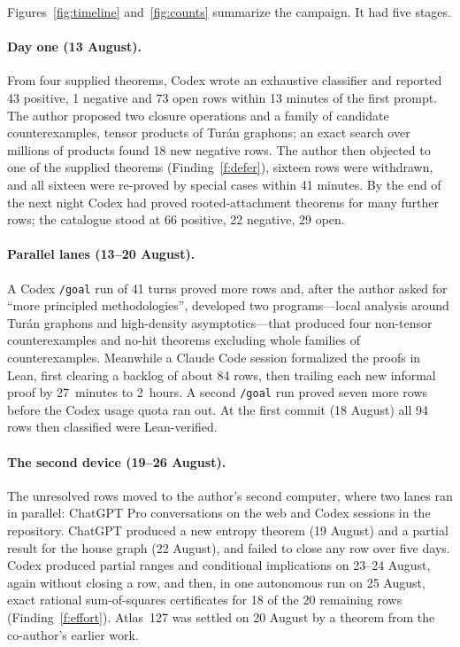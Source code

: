 \documentclass[11pt,a4paper]{article}
\newcommand{\ttt}[1]{\texttt{#1}}
\begin{document}
Figures~\ref{fig:timeline} and~\ref{fig:counts} summarize the campaign. It had five stages.

\paragraph{Day one (13 August).} From four supplied theorems, Codex wrote an exhaustive classifier and reported
43 positive, 1 negative and 73 open rows within 13 minutes of the first prompt. The author proposed two closure
operations and a family of candidate counterexamples, tensor products of Tur\'an graphons; an exact search
over millions of products found 18 new negative rows. The author then objected to one of the supplied theorems
(Finding~\ref{f:defer}), sixteen rows were withdrawn, and all sixteen were re-proved by special cases within 41
minutes. By the end of the next night Codex had proved rooted-attachment theorems for many further rows; the
catalogue stood at 66 positive, 22 negative, 29 open.

\paragraph{Parallel lanes (13--20 August).} A Codex \ttt{/goal} run of 41 turns proved more rows and, after the
author asked for ``more principled methodologies'', developed two programs---local analysis around Tur\'an
graphons and high-density asymptotics---that produced four non-tensor counterexamples and no-hit theorems
excluding whole families of counterexamples. Meanwhile a Claude Code session formalized the proofs in Lean,
first clearing a backlog of about 84 rows, then trailing each new informal proof by 27~minutes to 2~hours. A
second \ttt{/goal} run proved seven more rows before the Codex usage quota ran out. At the first commit (18
August) all 94 rows then classified were Lean-verified.

\paragraph{The second device (19--26 August).} The unresolved rows moved to the author's second computer,
where two lanes ran in parallel: ChatGPT Pro conversations on the web and Codex sessions in the repository.
ChatGPT produced a new entropy theorem (19 August) and a partial result for the house graph (22 August), and
failed to close any row over five days. Codex produced partial ranges and conditional implications on
23--24 August, again without closing a row, and then, in one autonomous run on 25 August, exact rational
sum-of-squares certificates for 18 of the 20 remaining rows (Finding~\ref{f:effort}). Atlas~127 was
settled on 20 August by a theorem from the co-author's earlier work.
\end{document}
